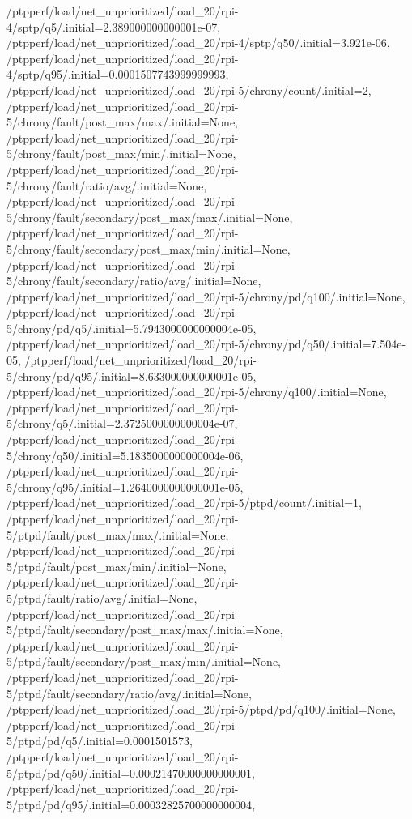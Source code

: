 {    /ptpperf/load/net_unprioritized/load_20/rpi-4/sptp/q5/.initial=2.389000000000001e-07,
    /ptpperf/load/net_unprioritized/load_20/rpi-4/sptp/q50/.initial=3.921e-06,
    /ptpperf/load/net_unprioritized/load_20/rpi-4/sptp/q95/.initial=0.0001507743999999993,
    /ptpperf/load/net_unprioritized/load_20/rpi-5/chrony/count/.initial=2,
    /ptpperf/load/net_unprioritized/load_20/rpi-5/chrony/fault/post_max/max/.initial=None,
    /ptpperf/load/net_unprioritized/load_20/rpi-5/chrony/fault/post_max/min/.initial=None,
    /ptpperf/load/net_unprioritized/load_20/rpi-5/chrony/fault/ratio/avg/.initial=None,
    /ptpperf/load/net_unprioritized/load_20/rpi-5/chrony/fault/secondary/post_max/max/.initial=None,
    /ptpperf/load/net_unprioritized/load_20/rpi-5/chrony/fault/secondary/post_max/min/.initial=None,
    /ptpperf/load/net_unprioritized/load_20/rpi-5/chrony/fault/secondary/ratio/avg/.initial=None,
    /ptpperf/load/net_unprioritized/load_20/rpi-5/chrony/pd/q100/.initial=None,
    /ptpperf/load/net_unprioritized/load_20/rpi-5/chrony/pd/q5/.initial=5.7943000000000004e-05,
    /ptpperf/load/net_unprioritized/load_20/rpi-5/chrony/pd/q50/.initial=7.504e-05,
    /ptpperf/load/net_unprioritized/load_20/rpi-5/chrony/pd/q95/.initial=8.633000000000001e-05,
    /ptpperf/load/net_unprioritized/load_20/rpi-5/chrony/q100/.initial=None,
    /ptpperf/load/net_unprioritized/load_20/rpi-5/chrony/q5/.initial=2.3725000000000004e-07,
    /ptpperf/load/net_unprioritized/load_20/rpi-5/chrony/q50/.initial=5.1835000000000004e-06,
    /ptpperf/load/net_unprioritized/load_20/rpi-5/chrony/q95/.initial=1.2640000000000001e-05,
    /ptpperf/load/net_unprioritized/load_20/rpi-5/ptpd/count/.initial=1,
    /ptpperf/load/net_unprioritized/load_20/rpi-5/ptpd/fault/post_max/max/.initial=None,
    /ptpperf/load/net_unprioritized/load_20/rpi-5/ptpd/fault/post_max/min/.initial=None,
    /ptpperf/load/net_unprioritized/load_20/rpi-5/ptpd/fault/ratio/avg/.initial=None,
    /ptpperf/load/net_unprioritized/load_20/rpi-5/ptpd/fault/secondary/post_max/max/.initial=None,
    /ptpperf/load/net_unprioritized/load_20/rpi-5/ptpd/fault/secondary/post_max/min/.initial=None,
    /ptpperf/load/net_unprioritized/load_20/rpi-5/ptpd/fault/secondary/ratio/avg/.initial=None,
    /ptpperf/load/net_unprioritized/load_20/rpi-5/ptpd/pd/q100/.initial=None,
    /ptpperf/load/net_unprioritized/load_20/rpi-5/ptpd/pd/q5/.initial=0.0001501573,
    /ptpperf/load/net_unprioritized/load_20/rpi-5/ptpd/pd/q50/.initial=0.00021470000000000001,
    /ptpperf/load/net_unprioritized/load_20/rpi-5/ptpd/pd/q95/.initial=0.00032825700000000004,
}
